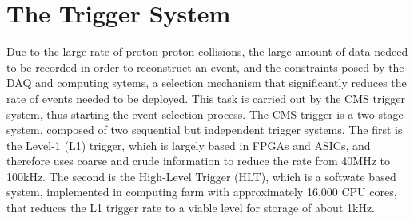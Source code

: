 \section{The Trigger System}
Due to the large rate of proton-proton collisions, the large amount
of data nedeed to be recorded in order to reconstruct an event, and the constraints posed by
the DAQ and computing sytems, a
selection mechanism that significantly reduces the rate of events
needed to be deployed. This task is carried out by the CMS trigger
system, thus starting the event selection process. The CMS trigger
is a two stage system, composed of two sequential but independent
trigger systems. The first is the Level-1 (L1) trigger, which is
largely based in FPGAs and ASICs, and therefore uses coarse and crude
information to reduce the rate from 40\unit{MHz} to 100\unit{kHz}. The
second is the High-Level Trigger (HLT), which is a softwate based
system, implemented in computing farm with approximately 16,000 CPU
cores, that reduces the L1 trigger rate to a viable level for storage
of about 1\unit{kHz}.